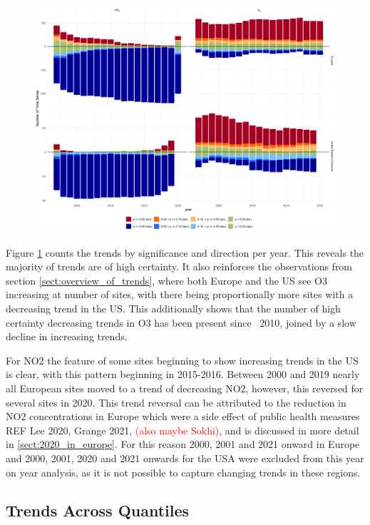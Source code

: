 \documentclass[journal abbreviation, manuscript]{copernicus}
\begin{document}
\begin{figure}[htbp]
\includegraphics[width=12cm]{plots/p_bar_year.png}
\caption{}
\label{fig:p_bar_year}
\end{figure}

Figure \ref{fig:p_bar_year} counts the trends by significance and direction per year. This reveals the majority of trends are of high certainty. It also reinforces the observations from section \ref{sect:overview_of_trends}, where both Europe and the US see O3 increasing at number of sites, with there being proportionally more sites with a decreasing trend in the US. This additionally shows that the number of high certainty decreasing trends in O3 has been present since ~2010, joined by a slow decline in increasing trends. 

For NO2 the feature of some sites beginning to show increasing trends in the US is clear, with this pattern beginning in 2015-2016. Between 2000 and 2019 nearly all European sites moved to a trend of decreasing NO2, however, this reversed for several sites in 2020. This trend reversal can be attributed to the reduction in NO2 concentrations in Europe which were a side effect of public health measures REF Lee 2020, Grange 2021, \textcolor{red}{(also maybe Sokhi)}, and is discussed in more detail in \ref{sect:2020_in_europe}. For this reason 2000, 2001 and 2021 onward in Europe and 2000, 2001, 2020 and 2021 onwards for the USA were excluded from this year on year analysis, as it is not possible to capture changing trends in these regions. 


\subsection{Trends Across Quantiles} \label{sect:trends_across_quantiles}
\end{document}
